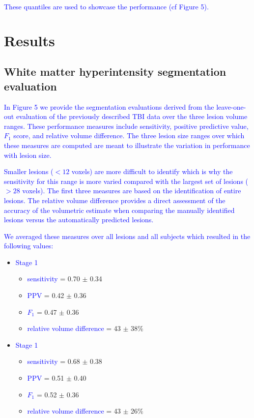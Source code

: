 \documentclass[11pt,]{article}
\begin{document}
\textcolor{blue}{These quantiles are used to showcase the performance (cf Figure 5).}

\section{Results}\label{results}

\subsection{White matter hyperintensity segmentation
evaluation}\label{white-matter-hyperintensity-segmentation-evaluation}

\textcolor{blue}{In Figure 5 we provide the segmentation evaluations derived from the leave-one-out evaluation
of the previously described TBI data over the three lesion volume ranges.
These performance measures include sensitivity,
positive predictive value, $F_1$ score, and relative volume difference.  The three lesion
size ranges over which these measures are computed are meant to illustrate the variation
in performance with lesion size.}

\textcolor{blue}{Smaller lesions ($< 12$ voxels) are more difficult
to identify which is why the sensitivity for this range is more varied compared with the largest
set of lesions ($> 28$ voxels).   The first three measures are based on the identification of
entire lesions.  The relative volume difference provides a direct assessment of the accuracy of
the volumetric estimate when comparing the manually identified lesions versus the
automatically predicted lesions.}

\textcolor{blue}{
We averaged these measures over all lesions and all subjects which resulted in the
following values:}

\begin{itemize}
\item
  \textcolor{blue}{Stage 1}

  \begin{itemize}
  \item
    \textcolor{blue}{sensitivity} = 0.70 \(\pm\) 0.34
  \item
    \textcolor{blue}{PPV} = 0.42 \(\pm\) 0.36
  \item
    \textcolor{blue}{$F_1$} = 0.47 \(\pm\) 0.36
  \item
    \textcolor{blue}{relative volume difference} = 43 \(\pm\) 38\%
  \end{itemize}
\item
  \textcolor{blue}{Stage 1}

  \begin{itemize}
  \item
    \textcolor{blue}{sensitivity} = 0.68 \(\pm\) 0.38
  \item
    \textcolor{blue}{PPV} = 0.51 \(\pm\) 0.40
  \item
    \textcolor{blue}{$F_1$} = 0.52 \(\pm\) 0.36
  \item
    \textcolor{blue}{relative volume difference} = 43 \(\pm\) 26\%
  \end{itemize}
\end{itemize}
\end{document}
